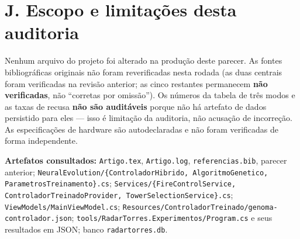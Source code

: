 \documentclass[11pt,a4paper]{article}
\begin{document}
\section*{J. Escopo e limitações desta auditoria}

Nenhum arquivo do projeto foi alterado na produção deste parecer. As fontes bibliográficas originais
não foram reverificadas nesta rodada (as duas centrais foram verificadas na revisão anterior; as
cinco restantes permanecem \textbf{não verificadas}, não ``corretas por omissão''). Os números da
tabela de três modos e as taxas de recusa \textbf{não são auditáveis} porque não há artefato de dados
persistido para eles --- isso é limitação da auditoria, não acusação de incorreção. As especificações
de hardware são autodeclaradas e não foram verificadas de forma independente.

\textbf{Artefatos consultados:} \texttt{Artigo.tex}, \texttt{Artigo.log}, \texttt{referencias.bib},
parecer anterior; \texttt{NeuralEvolution/\{ControladorHibrido, AlgoritmoGenetico,
ParametrosTreinamento\}.cs}; \texttt{Services/\{FireControlService, ControladorTreinadoProvider,
TowerSelectionService\}.cs}; \texttt{ViewModels/MainViewModel.cs};
\texttt{Resources/ControladorTreinado/genoma-controlador.json};
\texttt{tools/RadarTorres.Experimentos/Program.cs} e seus resultados em JSON; banco
\texttt{radartorres.db}.
\end{document}
